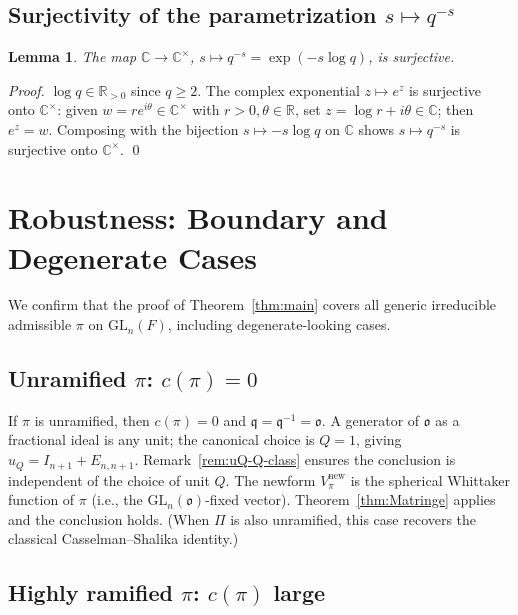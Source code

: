 \documentclass[12pt]{article}
\newtheorem{lemma}[theorem]{Lemma}
\theoremstyle{definition}
\begin{document}
\subsection{Surjectivity of the parametrization $s\mapsto q^{-s}$}

\begin{lemma}\label{lem:q-exp-surjective}
The map $\mathbb{C}\to\mathbb{C}^\times$, $s\mapsto q^{-s}=\exp(-s\log q)$, is surjective.
\end{lemma}

\begin{proof}
$\log q\in\mathbb{R}_{>0}$ since $q\ge 2$. The complex exponential $z\mapsto e^z$ is surjective onto $\mathbb{C}^\times$: given $w=re^{i\theta}\in\mathbb{C}^\times$ with $r>0,\theta\in\mathbb{R}$, set $z=\log r+i\theta\in\mathbb{C}$; then $e^z=w$. Composing with the bijection $s\mapsto -s\log q$ on $\mathbb{C}$ shows $s\mapsto q^{-s}$ is surjective onto $\mathbb{C}^\times$. \qed
\end{proof}

\section{Robustness: Boundary and Degenerate Cases}

We confirm that the proof of Theorem~\ref{thm:main} covers all generic irreducible admissible $\pi$ on $\mathrm{GL}_n(F)$, including degenerate-looking cases.

\subsection{Unramified $\pi$: $c(\pi)=0$}

If $\pi$ is unramified, then $c(\pi)=0$ and $\mathfrak{q}=\mathfrak{q}^{-1}=\mathfrak{o}$. A generator of $\mathfrak{o}$ as a fractional ideal is any unit; the canonical choice is $Q=1$, giving $u_Q=I_{n+1}+E_{n,n+1}$. Remark~\ref{rem:uQ-Q-class} ensures the conclusion is independent of the choice of unit $Q$. The newform $V_\pi^{\mathrm{new}}$ is the spherical Whittaker function of $\pi$ (i.e., the $\mathrm{GL}_n(\mathfrak{o})$-fixed vector). Theorem~\ref{thm:Matringe} applies and the conclusion holds. (When $\Pi$ is also unramified, this case recovers the classical Casselman--Shalika identity.)

\subsection{Highly ramified $\pi$: $c(\pi)$ large}
\end{document}
